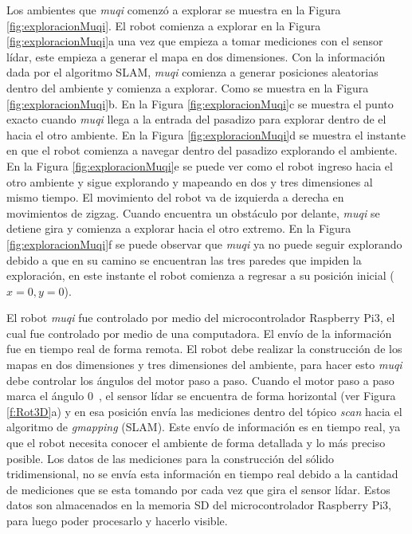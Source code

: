 Los ambientes que \textit{muqi} comenzó a explorar se muestra en la Figura 
\ref{fig:exploracionMuqi}. El robot comienza a explorar en la Figura 
\ref{fig:exploracionMuqi}a una vez que empieza a tomar mediciones con el sensor 
lídar, este empieza a generar el mapa en dos dimensiones. Con la información
dada por el algoritmo SLAM, \textit{muqi} comienza a generar posiciones aleatorias 
dentro del ambiente y comienza a explorar. Como se muestra en la Figura 
\ref{fig:exploracionMuqi}b. En la Figura \ref{fig:exploracionMuqi}c se muestra el 
punto exacto cuando \textit{muqi} llega a la entrada del pasadizo para explorar 
dentro de el hacia el otro ambiente. En la Figura \ref{fig:exploracionMuqi}d se 
muestra el instante en que el robot comienza a navegar dentro del pasadizo explorando 
el ambiente. En la Figura \ref{fig:exploracionMuqi}e se puede ver como el robot ingreso 
hacia el otro ambiente y sigue explorando y mapeando en dos y tres dimensiones al 
mismo tiempo. El movimiento del robot va de izquierda a derecha en movimientos de 
zigzag. Cuando encuentra un obstáculo por delante, \textit{muqi} se detiene gira y 
comienza a explorar hacia el otro extremo. En la Figura \ref{fig:exploracionMuqi}f 
se puede observar que \textit{muqi} ya no puede seguir explorando debido a que en 
su camino se encuentran las tres paredes que impiden la exploración, en este 
instante el robot comienza a regresar a su posición inicial ($x = 0, y = 0$).

El robot \textit{muqi} fue controlado por medio del microcontrolador Raspberry Pi3, el 
cual fue controlado por medio de una computadora. El envío de la información fue en 
tiempo real de forma remota. El robot debe realizar la construcción de los mapas en 
dos dimensiones y tres dimensiones del ambiente, para hacer esto \textit{muqi} debe 
controlar los ángulos del motor paso a paso. Cuando el motor paso a paso marca el 
ángulo 0~\grad, el sensor lídar se encuentra de forma horizontal (ver Figura \ref{f:Rot3D}a) 
y en esa posición envía las mediciones dentro del tópico \textit{scan} hacia el 
algoritmo de \textit{gmapping} (SLAM). Este envío de información es en tiempo real, ya 
que el robot necesita conocer el ambiente de forma detallada y lo más preciso posible. 
Los datos de las mediciones para la construcción del sólido tridimensional, no se envía
esta información en tiempo real debido a la cantidad de mediciones que se esta tomando por 
cada vez que gira el sensor lídar. Estos datos son almacenados en la memoria SD del 
microcontrolador Raspberry Pi3, para luego poder procesarlo y hacerlo visible.

